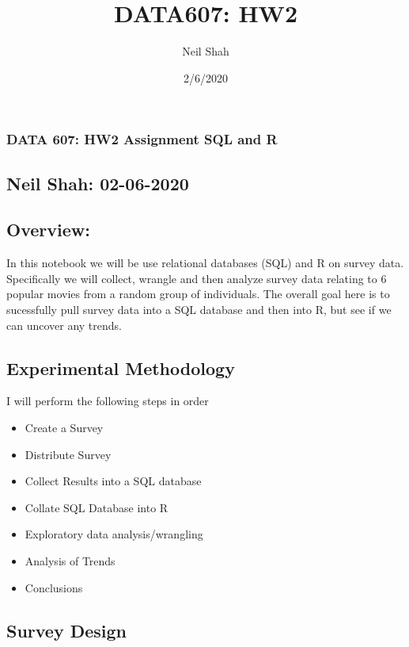 \documentclass[
]{article}
\title{DATA607: HW2}
\author{Neil Shah}
\date{2/6/2020}
\providecommand{\tightlist}{%
  \setlength{\itemsep}{0pt}\setlength{\parskip}{0pt}}
\begin{document}
\maketitle

\hypertarget{data-607-hw2-assignment-sql-and-r}{%
\subsubsection{DATA 607: HW2 Assignment SQL and
R}\label{data-607-hw2-assignment-sql-and-r}}

\hypertarget{neil-shah-02-06-2020}{%
\subsection{Neil Shah: 02-06-2020}\label{neil-shah-02-06-2020}}

\hypertarget{overview}{%
\subsection{Overview:}\label{overview}}

In this notebook we will be use relational databases (SQL) and R on
survey data. Specifically we will collect, wrangle and then analyze
survey data relating to 6 popular movies from a random group of
individuals. The overall goal here is to sucessfully pull survey data
into a SQL database and then into R, but see if we can uncover any
trends.

\hypertarget{experimental-methodology}{%
\subsection{Experimental Methodology}\label{experimental-methodology}}

I will perform the following steps in order

\begin{itemize}
\tightlist
\item
  Create a Survey
\item
  Distribute Survey
\item
  Collect Results into a SQL database
\item
  Collate SQL Database into R
\item
  Exploratory data analysis/wrangling
\item
  Analysis of Trends
\item
  Conclusions
\end{itemize}

\hypertarget{survey-design}{%
\subsection{Survey Design}\label{survey-design}}
\end{document}
